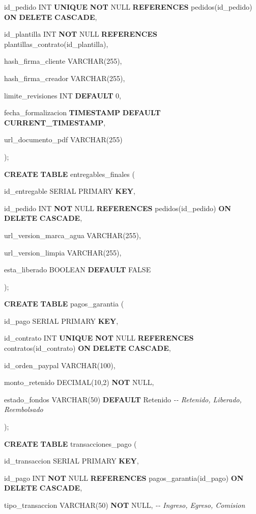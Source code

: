 \documentclass[
]{article}
\begin{document}
id\_pedido INT \textbf{UNIQUE} \textbf{NOT} NULL \textbf{REFERENCES}
pedidos(id\_pedido) \textbf{ON} \textbf{DELETE} \textbf{CASCADE},

id\_plantilla INT \textbf{NOT} NULL \textbf{REFERENCES}
plantillas\_contrato(id\_plantilla),

hash\_firma\_cliente VARCHAR(255),

hash\_firma\_creador VARCHAR(255),

limite\_revisiones INT \textbf{DEFAULT} 0,

fecha\_formalizacion \textbf{TIMESTAMP} \textbf{DEFAULT}
\textbf{CURRENT\_TIMESTAMP},

url\_documento\_pdf VARCHAR(255)

);

\textbf{CREATE} \textbf{TABLE} entregables\_finales (

id\_entregable SERIAL PRIMARY \textbf{KEY},

id\_pedido INT \textbf{NOT} NULL \textbf{REFERENCES} pedidos(id\_pedido)
\textbf{ON} \textbf{DELETE} \textbf{CASCADE},

url\_version\_marca\_agua VARCHAR(255),

url\_version\_limpia VARCHAR(255),

esta\_liberado BOOLEAN \textbf{DEFAULT} FALSE

);

\textbf{CREATE} \textbf{TABLE} pagos\_garantia (

id\_pago SERIAL PRIMARY \textbf{KEY},

id\_contrato INT \textbf{UNIQUE} \textbf{NOT} NULL \textbf{REFERENCES}
contratos(id\_contrato) \textbf{ON} \textbf{DELETE} \textbf{CASCADE},

id\_orden\_paypal VARCHAR(100),

monto\_retenido DECIMAL(10,2) \textbf{NOT} NULL,

estado\_fondos VARCHAR(50) \textbf{DEFAULT}
\textquotesingle Retenido\textquotesingle{} \emph{-\/- Retenido,
Liberado, Reembolsado}

);

\textbf{CREATE} \textbf{TABLE} transacciones\_pago (

id\_transaccion SERIAL PRIMARY \textbf{KEY},

id\_pago INT \textbf{NOT} NULL \textbf{REFERENCES}
pagos\_garantia(id\_pago) \textbf{ON} \textbf{DELETE} \textbf{CASCADE},

tipo\_transaccion VARCHAR(50) \textbf{NOT} NULL, \emph{-\/- Ingreso,
Egreso, Comision}
\end{document}
